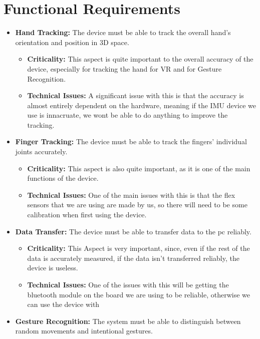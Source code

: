 \documentclass[12pt,a4paper,oneside]{book}
\theoremstyle{plain}
\numberwithin{equation}{chapter}
\begin{document}
\chapter*{Functional Requirements}

\begin{itemize}
    \item \textbf{Hand Tracking:} The device must be able to track the overall hand's orientation and position in 3D space.
        \begin{itemize}
            \item \textbf{Criticality:} This aspect is quite important to the overall accuracy of the device, especially for tracking the hand for VR and for Gesture Recognition.
            \item \textbf{Technical Issues:} A significant issue with this is that the accuracy is almost entirely dependent on the hardware, meaning if the IMU device we use is innacruate, we wont be able to do anything to improve the tracking.
        \end{itemize}
    \item \textbf{Finger Tracking:} The device must be able to track the fingers' individual joints accurately.
        \begin{itemize}
            \item \textbf{Criticality:} This aspect is also quite important, as it is one of the main functions of the device.
            \item \textbf{Technical Issues:} One of the main issues with this is that the flex sensors that we are using are made by us, so there will need to be some calibration when first using the device.
        \end{itemize}
    \item \textbf{Data Transfer:} The device must be able to transfer data to the pc reliably.
        \begin{itemize}
            \item \textbf{Criticality:} This Aspect is very important, since, even if the rest of the data is accurately measured, if the data isn't transferred reliably, the device is useless.
            \item \textbf{Technical Issues:} One of the issues with this will be getting the bluetooth module on the board we are using to be reliable, otherwise we can use the device with
        \end{itemize}
    \item \textbf{Gesture Recognition:} The system must be able to distinguish between random movements and intentional gestures.

\end{itemize}
\end{document}
